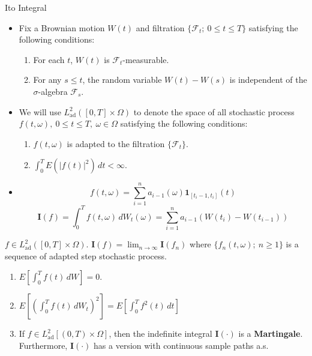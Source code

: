 \documentclass[final]{beamer}
\newlength{\colwidth}
\begin{document}
\begin{frame}[t]
\begin{columns}[t]
\begin{column}{\colwidth}
\begin{block}{It$\hat{\text{o}}$ Integral}
    \begin{itemize}
       \item Fix a Brownian motion $W(t)$ and filtration $\{ \mathcal{F}_t; \ 0 \leq t \leq T \}$ satisfying the following conditions:
       \begin{enumerate}
           \item For each $t$, $W(t)$ is $\mathcal{F}_t$-measurable.
           \item For any $s \leq t$, the random variable $W(t) - W(s)$ is independent of the $\sigma$-algebra $\mathcal{F}_s$.
       \end{enumerate}
       \item We will use $L_\text{ad}^2([0,T] \times \Omega)$ to denote the space of all stochastic process $f(t,\omega), \ 0 \leq t \leq T, \ \omega \in \Omega$ satisfying the following conditions:
       \begin{enumerate}
           \item $f(t,\omega)$ is adapted to the filtration $\{\mathcal{F}_t\}$.
           \item $\int_0^T{E({\left | f(t) \right |}^2)}\,dt < \infty$.
       \end{enumerate}
        \item \[f(t,\omega) = \sum_{i=1}^{n}{a_{i-1}(\omega)\mathbf{1}_{[t_i-1,t_i]}(t)}\]
        \[\mathbf{I}(f) = \int_0^T f(t,\omega)\,dW_t(\omega) = \sum_{i=1}^n{a_{i-1}(W(t_i) - W(t_{i-1}))}\]
           \end{itemize}
         $f \in L_\text{ad}^2([0,T] \times \Omega)$. $\mathbf{I}(f) = \lim_{n \rightarrow \infty}\mathbf{I}(f_n)$ where $\{f_n(t,\omega); \ n \geq 1\}$ is a sequence of adapted step stochastic process.
        \begin{enumerate}
            \item ${E}[\int_0^T f(t)\,dW] = 0$.
          \item ${E}[(\int_0^T f(t)\,dW_t)^{2}] = E[\int_0^T f^{2}(t)\,dt]$ 
          \item If $f \in L^2_\text{ad}[(0,T) \times \Omega]$, then the indefinite integral $\mathbf{I}(\cdot)$ is a \textbf{Martingale}. Furthermore, $\mathbf{I}(\cdot)$ has a version with continuous sample paths a.s.
        \end{enumerate}

 

  \end{block}
  

\end{column}
\end{columns}
\end{frame}
\end{document}
